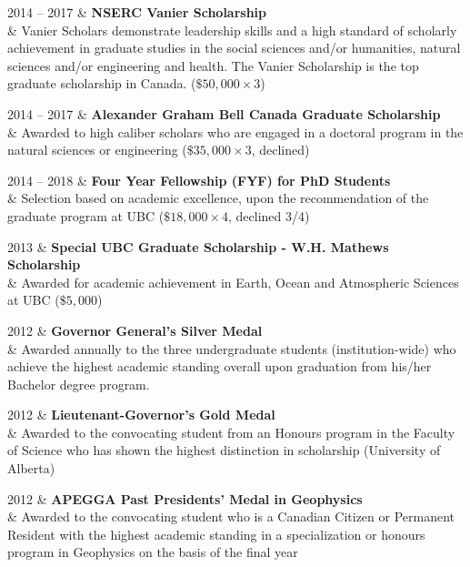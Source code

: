 \documentclass[a4paper, 11pt]{article}
\begin{document}
\begin{entryright}
2014 -- 2017 & \textbf{NSERC Vanier Scholarship} \\
& Vanier Scholars demonstrate leadership skills and a high standard of scholarly achievement in graduate studies in the social sciences and/or humanities, natural sciences and/or engineering and health. The Vanier Scholarship is the top graduate scholarship in Canada. ($ \$50,000 \times 3$)
\end{entryright}

\begin{entryright}
2014 -- 2017 & \textbf{Alexander Graham Bell Canada Graduate Scholarship} \\
& Awarded to high caliber scholars who are engaged in a doctoral program in the natural sciences or engineering ($ \$35,000 \times 3$, declined)
\end{entryright}

\begin{entryright}
2014 -- 2018 & \textbf{Four Year Fellowship (FYF) for PhD Students} \\
& Selection based on academic excellence, upon the recommendation of the graduate program at UBC ($\$18,000 \times 4$, declined 3/4)
\end{entryright}

\begin{entryright}
2013 & \textbf{Special UBC Graduate Scholarship - W.H. Mathews Scholarship} \\
& Awarded for academic achievement in Earth, Ocean and Atmospheric Sciences at UBC ($\$5,000$)
\end{entryright}

\begin{entryright}
2012 & \textbf{Governor General’s Silver Medal} \\
& Awarded annually to the three undergraduate students (institution-wide) who achieve the highest academic standing overall upon graduation from his/her Bachelor degree program.
\end{entryright}

\begin{entryright}
2012 & \textbf{Lieutenant-Governor’s Gold Medal} \\
& Awarded to the convocating student from an Honours program in the Faculty of Science who has shown the highest distinction in scholarship (University of Alberta)
\end{entryright}

\begin{entryright}
2012 & \textbf{APEGGA Past Presidents’ Medal in Geophysics} \\
& Awarded to the convocating student who is a Canadian Citizen or Permanent Resident with the highest academic standing in a specialization or honours program in Geophysics on the basis of the final year
\end{entryright}
\end{document}

